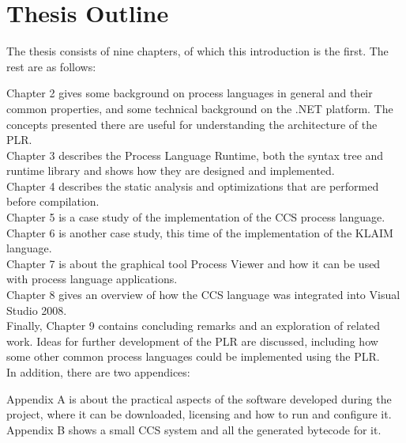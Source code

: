 \section{Thesis Outline}

	The thesis consists of nine chapters, of which this introduction is the 
	first. The rest are as follows:

	Chapter 2 gives some background on process languages in general and their 
	common properties, and some technical background on the .NET platform. The 
	concepts presented there are useful for understanding the architecture of 
	the PLR.\\
	Chapter 3 describes the Process Language Runtime, both the syntax tree and 
	runtime library and shows how they are designed and implemented. \\
	Chapter 4 describes the static analysis and optimizations that are performed
	before compilation.\\
	Chapter 5 is a case study of the implementation of the CCS process 
	language.\\
	Chapter 6 is another case study, this time of the implementation of the 
	KLAIM language.\\
	Chapter 7 is about the graphical tool Process Viewer and how it can be used
	with process language applications.\\
	Chapter 8 gives an overview of how the CCS language was integrated into 
	Visual Studio 2008. \\
	Finally, Chapter 9 contains concluding remarks and an exploration of related 
	work. Ideas for further development of the PLR are discussed, including how 
	some other common process languages could be implemented using the PLR.\\
 
	In addition, there are two appendices:
	
	Appendix A is about the practical aspects of the software developed during 
	the project, where it can be downloaded, licensing and how to run and 
	configure it.\\
	Appendix B shows a small CCS system and all the generated bytecode for it.